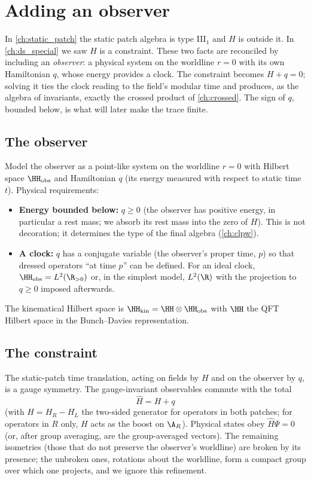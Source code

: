 \chapter{Adding an observer}\label{ch:add_observer}

\begin{physmotiv}
In \cref{ch:static_patch} the static patch algebra is type III$_1$ and $H$ is outside it. In \cref{ch:ds_special} we saw $H$ is a constraint. These two facts are reconciled by including an \emph{observer}: a physical system on the worldline $r=0$ with its own Hamiltonian $q$, whose energy provides a clock. The constraint becomes $H+q=0$; solving it ties the clock reading to the field's modular time and produces, as the algebra of invariants, exactly the crossed product of \cref{ch:crossed}. The sign of $q$, bounded below, is what will later make the trace finite.
\end{physmotiv}

\section{The observer}

Model the observer as a point-like system on the worldline $r=0$ with Hilbert space $\HH_{\rm obs}$ and Hamiltonian $q$ (its energy measured with respect to static time $t$). Physical requirements:
\begin{itemize}
\item \textbf{Energy bounded below:} $q\ge0$ (the observer has positive energy, in particular a rest mass; we absorb its rest mass into the zero of $H$). This is not decoration; it determines the type of the final algebra (\cref{ch:clpw}).
\item \textbf{A clock:} $q$ has a conjugate variable (the observer's proper time, $p$) so that dressed operators ``at time $p$'' can be defined. For an ideal clock, $\HH_{\rm obs}=L^2(\R_{>0})$ or, in the simplest model, $L^2(\R)$ with the projection to $q\ge0$ imposed afterwards.
\end{itemize}
The kinematical Hilbert space is $\HH_{\rm kin}=\HH\otimes\HH_{\rm obs}$ with $\HH$ the QFT Hilbert space in the Bunch--Davies representation.

\section{The constraint}

The static-patch time translation, acting on fields by $H$ and on the observer by $q$, is a gauge symmetry. The gauge-invariant observables commute with the total
\begin{equation}
\hat H=H+q
\end{equation}
(with $H=H_R-H_L$ the two-sided generator for operators in both patches; for operators in $R$ only, $H$ acts as the boost on $\A_R$). Physical states obey $\hat H\Psi=0$ (or, after group averaging, are the group-averaged vectors). The remaining isometries (those that do not preserve the observer's worldline) are broken by its presence; the unbroken ones, rotations about the worldline, form a compact group over which one projects, and we ignore this refinement.

